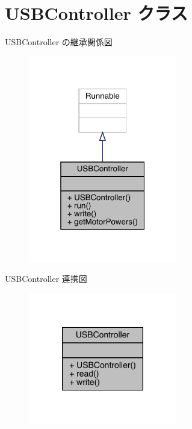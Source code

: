 \hypertarget{class_u_s_b_controller}{}\section{U\+S\+B\+Controller クラス}
\label{class_u_s_b_controller}


U\+S\+B\+Controller の継承関係図\nopagebreak
\begin{figure}[H]
\begin{center}
\leavevmode
\includegraphics[width=184pt]{de/d83/class_u_s_b_controller__inherit__graph}
\end{center}
\end{figure}


U\+S\+B\+Controller 連携図\nopagebreak
\begin{figure}[H]
\begin{center}
\leavevmode
\includegraphics[width=184pt]{d2/d26/class_u_s_b_controller__coll__graph}
\end{center}
\end{figure}
